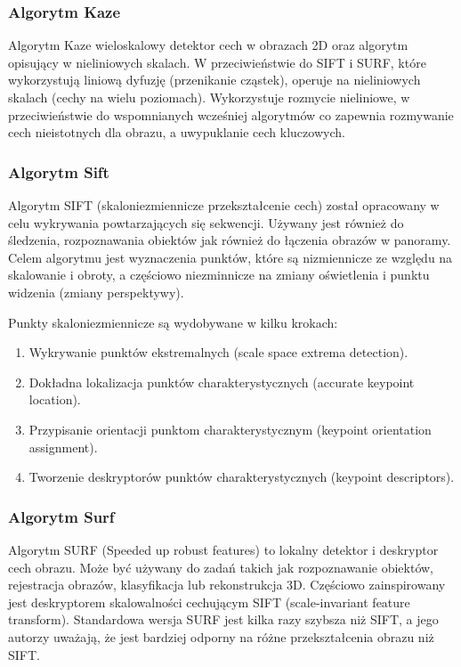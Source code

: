 \documentclass[12pt, notitlepage]{article}
\begin{document}
\subsubsection{Algorytm Kaze}

Algorytm Kaze wieloskalowy detektor cech w obrazach 2D oraz algorytm opisujący w nieliniowych skalach. W przeciwieństwie do SIFT i SURF, które wykorzystują liniową dyfuzję (przenikanie cząstek), operuje na nieliniowych skalach (cechy na wielu poziomach). Wykorzystuje rozmycie nieliniowe, w przeciwieństwie do wspomnianych wcześniej algorytmów co zapewnia rozmywanie cech nieistotnych dla obrazu, a uwypuklanie cech kluczowych.

\subsubsection{Algorytm Sift}

Algorytm SIFT (skaloniezmiennicze przekształcenie cech) został opracowany w celu wykrywania powtarzających się sekwencji. Używany jest również do śledzenia, rozpoznawania obiektów jak również do łączenia obrazów w panoramy. Celem algorytmu jest wyznaczenia punktów, które są nizmiennicze ze względu na skalowanie i obroty, a częściowo niezminnicze na zmiany oświetlenia i punktu widzenia (zmiany perspektywy).

Punkty skaloniezmiennicze są wydobywane w kilku krokach:
\begin{enumerate}
    \item Wykrywanie punktów ekstremalnych (scale space extrema detection).
    \item Dokładna lokalizacja punktów charakterystycznych (accurate keypoint location).
    \item Przypisanie orientacji punktom charakterystycznym (keypoint orientation assignment).
    \item Tworzenie deskryptorów punktów charakterystycznych (keypoint descriptors).
\end{enumerate}

\subsubsection{Algorytm Surf}

Algorytm SURF (Speeded up robust features) to lokalny detektor i deskryptor cech obrazu. Może być używany do zadań takich jak rozpoznawanie obiektów, rejestracja obrazów, klasyfikacja lub rekonstrukcja 3D. Częściowo zainspirowany jest deskryptorem skalowalności cechującym SIFT (scale-invariant feature transform). Standardowa wersja SURF jest kilka razy szybsza niż SIFT, a jego autorzy uważają, że jest bardziej odporny na różne przekształcenia obrazu niż SIFT.
\end{document}
